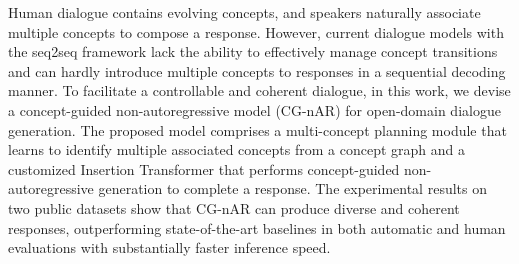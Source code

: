 Human dialogue contains evolving concepts, and speakers naturally associate multiple concepts to compose a response. However, current dialogue models with the seq2seq framework lack the ability to effectively manage concept transitions and can hardly introduce multiple concepts to responses in a sequential decoding manner. To facilitate a controllable and coherent dialogue, in this work, we devise a concept-guided non-autoregressive model (CG-nAR) for open-domain dialogue generation. The proposed model comprises a multi-concept planning module that learns to identify multiple associated concepts from a concept graph and a customized Insertion Transformer that performs concept-guided non-autoregressive generation to complete a response. The experimental results on two public datasets show that CG-nAR can produce diverse and coherent responses, outperforming state-of-the-art baselines in both automatic and human evaluations with substantially faster inference speed.
